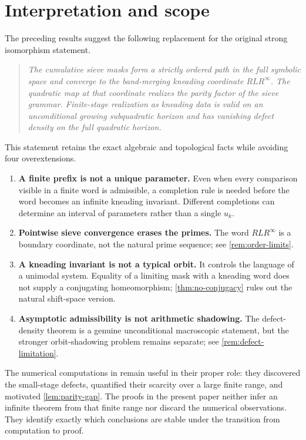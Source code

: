 \documentclass[11pt]{article}
\theoremstyle{definition}
\theoremstyle{remark}
\begin{document}
\section{Interpretation and scope}

The preceding results suggest the following replacement for the original strong isomorphism statement.

\begin{quote}
\emph{The cumulative sieve masks form a strictly ordered path in the full symbolic space and converge to the band-merging kneading coordinate $RLR^\infty$.  The quadratic map at that coordinate realizes the parity factor of the sieve grammar.  Finite-stage realization as kneading data is valid on an unconditional growing subquadratic horizon and has vanishing defect density on the full quadratic horizon.}
\end{quote}

This statement retains the exact algebraic and topological facts while avoiding four overextensions.

\begin{enumerate}[label=(\arabic*)]
    \item \textbf{A finite prefix is not a unique parameter.}  Even when every comparison visible in a finite word is admissible, a completion rule is needed before the word becomes an infinite kneading invariant.  Different completions can determine an interval of parameters rather than a single $u_k$.

    \item \textbf{Pointwise sieve convergence erases the primes.}  The word $RLR^\infty$ is a boundary coordinate, not the natural prime sequence; see \cref{rem:order-limits}.

    \item \textbf{A kneading invariant is not a typical orbit.}  It controls the language of a unimodal system.  Equality of a limiting mask with a kneading word does not supply a conjugating homeomorphism; \cref{thm:no-conjugacy} rules out the natural shift-space version.

    \item \textbf{Asymptotic admissibility is not arithmetic shadowing.}  The defect-density theorem is a genuine unconditional macroscopic statement, but the stronger orbit-shadowing problem remains separate; see \cref{rem:defect-limitation}.
\end{enumerate}

The numerical computations in \citet{Wang2026Published,WangTransient2026} remain useful in their proper role: they discovered the small-stage defects, quantified their scarcity over a large finite range, and motivated \cref{lem:parity-gap}.  The proofs in the present paper neither infer an infinite theorem from that finite range nor discard the numerical observations.  They identify exactly which conclusions are stable under the transition from computation to proof.
\end{document}
